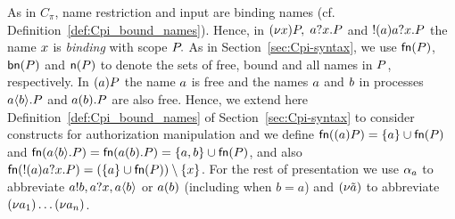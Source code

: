 
As in $C_\pi$, name restriction and input are binding names (cf. Definition~\ref{def:Cpi_bound_names}). Hence, in $(\nu x) P,$ $a?x.P$ and $!(a)a?x.P$ the name $x$ is {\it binding} with scope $P.$ 
As in Section~\ref{sec:Cpi-syntax}, we use $\mathsf{fn}(P)$, $\mathsf{bn}(P)$ and $\mathsf{n}(P)$ to denote the sets of free, bound and all names in $P$, respectively. 
In $(a)P$ the name $a$ is free and the names $a$ and $b$ in processes $a\langle b\rangle.P$ and $a(b).P$ are also free. Hence, we extend here Definition~\ref{def:Cpi_bound_names} of Section~\ref{sec:Cpi-syntax} to consider constructs for authorization manipulation and we define $\mathsf{fn}((a)P)=\{a\}\cup\mathsf{fn}(P)$ and $\mathsf{fn}(a\langle b\rangle.P)=\mathsf{fn}(a(b).P)=\{a,b\}\cup\mathsf{fn}(P)$, and also $\mathsf{fn}(!(a)a?x.P)=(\{a\}\cup\mathsf{fn}(P))\setminus\{x\}$.
For the rest of presentation we use $\alpha_a$ to abbreviate $a!b, a?x, a\langle b\rangle$ or $a(b)$ (including when $b = a$)
 and $(\nu \tilde{a})$ to abbreviate $(\nu a_1)\ldots(\nu a_n)$.
 

